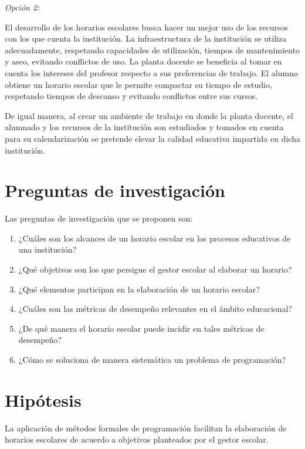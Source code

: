 \documentclass[spanish,draft,12pt,headsepline,footsepline,paper=letter]{scrreprt}
\begin{document}
\textit{Opción 2:}

El desarrollo de los horarios escolares busca hacer un mejor uso de los recursos con los que cuenta la institución. La infraestructura de la institución se utiliza adecuadamente, respetando capacidades de utilización, tiempos de mantenimiento y aseo, evitando conflictos de uso. La planta docente se beneficia al tomar en cuenta los intereses del profesor respecto a sus preferencias de trabajo. El alumno obtiene un horario escolar que le permite compactar su tiempo de estudio, respetando tiempos de descanso y evitando conflictos entre sus cursos.

De igual manera, al crear un ambiente de trabajo en donde la planta docente, el alumnado y los recursos de la institución son estudiados y tomados en cuenta para su calendarización se pretende elevar la calidad educativa impartida en dicha institución.

\section*{Preguntas de investigación}

Las preguntas de investigación que se proponen son:

\begin{enumerate}[1]
\setlength{\itemsep}{0cm}%
\setlength{\parskip}{0cm}%
\item ¿Cuáles son los alcances de un horario escolar en los procesos educativos de una institución?
\item ¿Qué objetivos son los que persigue el gestor escolar al elaborar un horario?
\item ¿Qué elementos participan en la elaboración de un horario escolar?
\item ¿Cuáles son las métricas de desempeño relevantes en el ámbito educacional?
\item ¿De qué manera el horario escolar puede incidir en tales métricas de desempeño?
\item ¿Cómo se soluciona de manera sistemática un problema de programación?
\end{enumerate}

\section*{Hipótesis}

La aplicación de métodos formales de programación facilitan la elaboración de horarios escolares de acuerdo a objetivos planteados por el gestor escolar.
\end{document}
